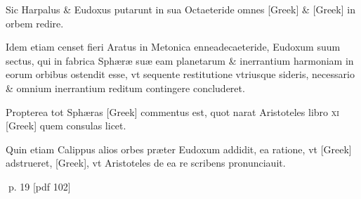 \begin{parnumbers}
Sic Harpalus \& Eudoxus putarunt in sua Octaeteride omnes \textgreek{[Greek]} \& \textgreek{[Greek]} in orbem redire.

Idem etiam censet fieri Aratus in Metonica enneadecaeteride, Eudoxum suum sectus, qui in fabrica Sphæræ suæ eam planetarum \& inerrantium harmoniam in eorum orbibus ostendit esse, vt sequente  restitutione vtriusque sideris, necessario \& omnium inerrantium reditum contingere concluderet.

Propterea tot Sphæras \textgreek{[Greek]} commentus est, quot narat Aristoteles libro \textsc{xi} \textgreek{[Greek]} quem consulas licet.

Quin etiam Calippus alios orbes præter Eudoxum addidit, ea ratione, vt \textgreek{[Greek]} adstrueret, \textgreek{[Greek]}, vt Aristoteles de ea re scribens pronunciauit.

\end{parnumbers}
\clearpage
p. 19 [pdf 102]

